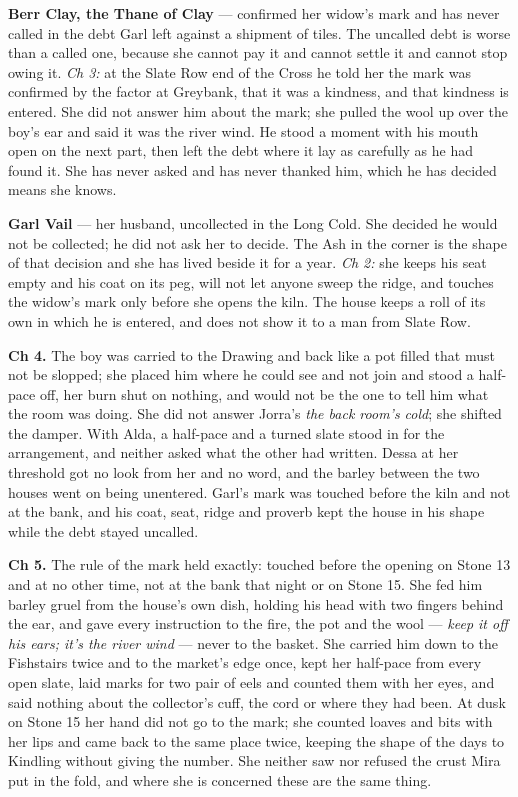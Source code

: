 \documentclass{design/chronicle}
\begin{document}
{\textbf{Berr Clay, the Thane of Clay} — confirmed her widow’s mark and has never called in the debt Garl left against a shipment of tiles. The uncalled debt is worse than a called one, because she cannot pay it and cannot settle it and cannot stop owing it. \emph{Ch 3:} at the Slate Row end of the Cross he told her the mark was confirmed by the factor at Greybank, that it was a kindness, and that kindness is entered. She did not answer him about the mark; she pulled the wool up over the boy’s ear and said it was the river wind. He stood a moment with his mouth open on the next part, then left the debt where it lay as carefully as he had found it. She has never asked and has never thanked him, which he has decided means she knows.

\textbf{Garl Vail} — her husband, uncollected in the Long Cold. She decided he would not be collected; he did not ask her to decide. The Ash in the corner is the shape of that decision and she has lived beside it for a year. \emph{Ch 2:} she keeps his seat empty and his coat on its peg, will not let anyone sweep the ridge, and touches the widow’s mark only before she opens the kiln. The house keeps a roll of its own in which he is entered, and does not show it to a man from Slate Row.

\textbf{Ch 4.} The boy was carried to the Drawing and back like a pot filled that must not be slopped; she placed him where he could see and not join and stood a half-pace off, her burn shut on nothing, and would not be the one to tell him what the room was doing. She did not answer Jorra’s \emph{the back room’s cold}; she shifted the damper. With Alda, a half-pace and a turned slate stood in for the arrangement, and neither asked what the other had written. Dessa at her threshold got no look from her and no word, and the barley between the two houses went on being unentered. Garl’s mark was touched before the kiln and not at the bank, and his coat, seat, ridge and proverb kept the house in his shape while the debt stayed uncalled.

\textbf{Ch 5.} The rule of the mark held exactly: touched before the opening on Stone 13 and at no other time, not at the bank that night or on Stone 15. She fed him barley gruel from the house’s own dish, holding his head with two fingers behind the ear, and gave every instruction to the fire, the pot and the wool --- \emph{keep it off his ears; it’s the river wind} --- never to the basket. She carried him down to the Fishstairs twice and to the market’s edge once, kept her half-pace from every open slate, laid marks for two pair of eels and counted them with her eyes, and said nothing about the collector’s cuff, the cord or where they had been. At dusk on Stone 15 her hand did not go to the mark; she counted loaves and bits with her lips and came back to the same place twice, keeping the shape of the days to Kindling without giving the number. She neither saw nor refused the crust Mira put in the fold, and where she is concerned these are the same thing.

}
\end{document}
